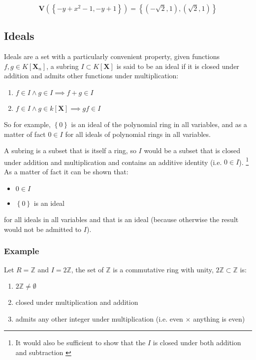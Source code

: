 \documentclass[a4paper,11pt,twoside]{article}
\begin{document}
\[
   \boldsymbol{V}\left(\left\{ -y+x^{2}-1,-y+1\right\}\right)=\left\{ \left(-\sqrt{2},1\right),\left(\sqrt{2},1\right)\right\} 
   \]

\subsection{Ideals}
\label{sec:org4222d78}
Ideals are a set with a particularly convenient property, given
functions \(f,g\in K\left[\mathbf{X}_n\right]\), a subring
\(I\subset K\left[\textbf{X}\right]\) is said to be an ideal if it
is closed under addition and admits other functions under
multiplication: \cite[\S 1.1.3]{hibiGrobnerBasesStatistics2014}

\begin{enumerate}
\item \(f\in I \land g \in I \implies f+g \in I\)
\item \(f\in I \land g \in k\left[ \textbf{X} \right] \implies gf \in I\)
\end{enumerate}

So for example, \(\left\{0\right\}\) is an ideal of the polynomial ring in
all variables, and as a matter of fact \(0\in I\) for all ideals of
polynomial rings in all variables.

A subring is a subset that is itself a ring, so \(I\) would be a
subset that is closed under addition and multiplication and
contains an additive identity (i.e. \(0 \in I\)). \footnote{It would also be sufficient to show that the \(I\) is closed
under both addition and subtraction \cite[\S 16.1]{judsonAbstractAlgebraTheory2016}} As a
matter of fact it can be shown that:

\begin{itemize}
\item \(0\in I\)
\item \(\left\{0\right\}\) is an ideal
\end{itemize}

for all ideals in all variables and that is an ideal (because
otherwise the result would not be admitted to \(I\)).
\subsubsection{Example}
\label{sec:org7443404}

Let \(R = \mathbb{Z}\) and \(I=2\mathbb{Z}\), the set of
\(\mathbb{Z}\) is a commutative ring with unity, \(2\mathbb{Z}
    \subset \mathbb{Z}\) is:

\begin{enumerate}
\item \(2\mathbb{Z} \neq \emptyset\)
\item closed under multiplication and addition
\item admits any other integer under multiplication (i.e. even
\(\times\) anything is even)
\end{enumerate}
\end{document}
